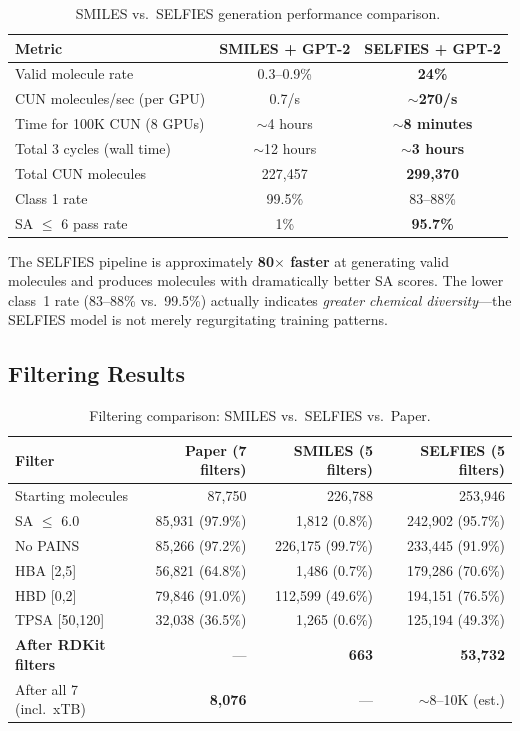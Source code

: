 \documentclass[11pt,a4paper]{article}
\begin{document}
\begin{table}[H]
\centering
\caption{SMILES vs.\ SELFIES generation performance comparison.}
\label{tab:smiles_vs_selfies}
\begin{tabular}{lcc}
\toprule
Metric & SMILES + GPT-2 & SELFIES + GPT-2 \\
\midrule
Valid molecule rate & 0.3--0.9\% & \textbf{24\%} \\
CUN molecules/sec (per GPU) & 0.7/s & \textbf{$\sim$270/s} \\
Time for 100K CUN (8 GPUs) & $\sim$4 hours & \textbf{$\sim$8 minutes} \\
Total 3 cycles (wall time) & $\sim$12 hours & \textbf{$\sim$3 hours} \\
Total CUN molecules & 227,457 & \textbf{299,370} \\
Class 1 rate & 99.5\% & 83--88\% \\
SA $\leq$ 6 pass rate & 1\% & \textbf{95.7\%} \\
\bottomrule
\end{tabular}
\end{table}

The SELFIES pipeline is approximately \textbf{80$\times$ faster} at generating valid molecules and produces molecules with dramatically better SA scores. The lower class~1 rate (83--88\% vs.\ 99.5\%) actually indicates \textit{greater chemical diversity}---the SELFIES model is not merely regurgitating training patterns.

\subsection{Filtering Results}

\begin{table}[H]
\centering
\caption{Filtering comparison: SMILES vs.\ SELFIES vs.\ Paper.}
\label{tab:selfies_filtering}
\begin{tabular}{lrrr}
\toprule
Filter & Paper (7 filters) & SMILES (5 filters) & SELFIES (5 filters) \\
\midrule
Starting molecules & 87,750 & 226,788 & 253,946 \\
SA $\leq$ 6.0 & 85,931 (97.9\%) & 1,812 (0.8\%) & 242,902 (95.7\%) \\
No PAINS & 85,266 (97.2\%) & 226,175 (99.7\%) & 233,445 (91.9\%) \\
HBA [2,5] & 56,821 (64.8\%) & 1,486 (0.7\%) & 179,286 (70.6\%) \\
HBD [0,2] & 79,846 (91.0\%) & 112,599 (49.6\%) & 194,151 (76.5\%) \\
TPSA [50,120] & 32,038 (36.5\%) & 1,265 (0.6\%) & 125,194 (49.3\%) \\
\midrule
\textbf{After RDKit filters} & --- & \textbf{663} & \textbf{53,732} \\
After all 7 (incl.\ xTB) & \textbf{8,076} & --- & $\sim$8--10K (est.) \\
\bottomrule
\end{tabular}
\end{table}
\end{document}
